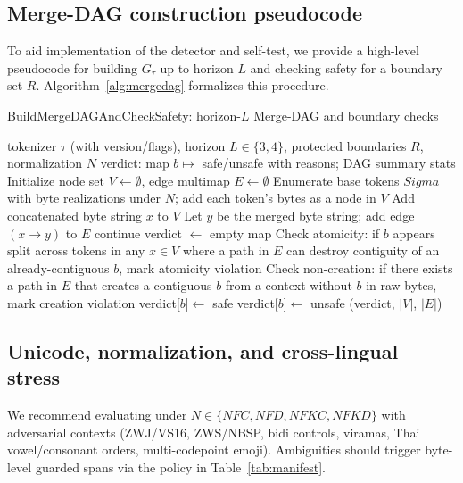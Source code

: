 \documentclass{article}
\def\Sigma{Sigma}%
\def\mathcal#1{#1}%
\def\mathrm#1{#1}%
\begin{document}
\subsection{Merge-DAG construction pseudocode}\label{sec:mergedag}
To aid implementation of the detector and self-test, we provide a high-level pseudocode for building $G_\tau$ up to horizon $L$ and checking safety for a boundary set $\mathcal{R}$. Algorithm~\ref{alg:mergedag} formalizes this procedure.

\begin{algorithm}[h]
\caption{BuildMergeDAGAndCheckSafety: horizon-$L$ Merge-DAG and boundary checks}
\label{alg:mergedag}
\begin{algorithmic}[1]
\Require tokenizer $\tau$ (with version/flags), horizon $L\in\{3,4\}$, protected boundaries $\mathcal{R}$, normalization $\mathcal{N}$
\Ensure verdict: map $b\mapsto$ safe/unsafe with reasons; DAG summary stats
\State Initialize node set $V\gets \emptyset$, edge multimap $E\gets \emptyset$
\State Enumerate base tokens $\Sigma$ with byte realizations under $\mathcal{N}$; add each token's bytes as a node in $V$
     \State Add concatenated byte string $x$ to $V$
  \EndFor
\EndFor
{}
      \State Let $y$ be the merged byte string; add edge $(x\to y)$ to $E$
     \State continue \EndIf
    \EndIf
  \EndFor
\EndFor
\State verdict $\gets$ empty map
\ForAll{$b\in\mathcal{R}$}
  \State Check atomicity: if $b$ appears split across tokens in any $x\in V$ where a path in $E$ can destroy contiguity of an already-contiguous $b$, mark atomicity violation
  \State Check non-creation: if there exists a path in $E$ that creates a contiguous $b$ from a context without $b$ in raw bytes, mark creation violation
   \State verdict[$b$]$\gets$ safe \Else \State verdict[$b$]$\gets$ unsafe \EndIf
\EndFor
\State \Return (verdict, $|V|$, $|E|$)
\end{algorithmic}
\end{algorithm}

\subsection{Unicode, normalization, and cross-lingual stress}
We recommend evaluating under $\mathcal{N}\in\{\mathrm{NFC,NFD,NFKC,NFKD}\}$ with adversarial contexts (ZWJ/VS16, ZWS/NBSP, bidi controls, viramas, Thai vowel/consonant orders, multi-codepoint emoji). Ambiguities should trigger byte-level guarded spans via the policy in Table~\ref{tab:manifest}.
\end{document}
